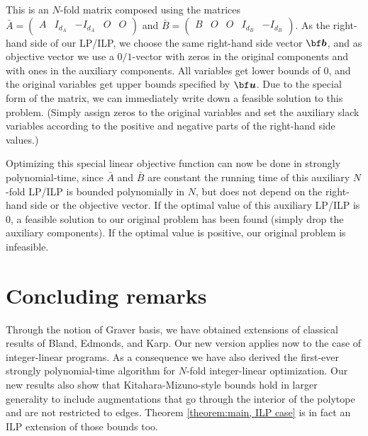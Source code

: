 \documentclass[moor]{informs1hack}              %
\def\ve#1{\mathchoice{\mbox{\boldmath$\displaystyle\bf#1$}}
{\mbox{\boldmath$\textstyle\bf#1$}}
{\mbox{\boldmath$\scriptstyle\bf#1$}}
{\mbox{\boldmath$\scriptscriptstyle\bf#1$}}}
\newcommand\veb{{\ve b}}
\newcommand\veu{{\ve u}}
\newcommand{\maO}{O}            %
\begin{document}
\noindent This is an $N$-fold matrix composed using the matrices $\bar{A}=\begin{pmatrix}A&I_{d_A}&-I_{d_A}&\maO&\maO\end{pmatrix}$ and $\bar{B}=\begin{pmatrix}B&\maO&\maO&I_{d_B}&-I_{d_B}\end{pmatrix}$. As the right-hand side of our LP/ILP, we choose the same right-hand side vector $\veb$, and as objective vector we use a $0/1$-vector with zeros in the original components and with ones in the auxiliary components. All variables get lower bounds of $0$, and the original variables get upper bounds specified by $\veu$. Due to the special form of the matrix, we can immediately write down a feasible solution to this problem. (Simply assign zeros to the original variables and set the auxiliary slack variables according to the positive and negative parts of the right-hand side values.)

  Optimizing this special linear objective function can now be done in strongly polynomial-time, since  $\bar{A}$ and $\bar{B}$ are constant the running time of this auxiliary $N$-fold LP/ILP is bounded polynomially in $N$, but does not depend on the right-hand side or the objective vector. If the optimal value of this auxiliary LP/ILP is $0$, a feasible solution to our original problem has been found (simply drop the auxiliary components). If the optimal value is positive, our original problem is infeasible.
\Halmos
\endproof

\section{Concluding remarks} 

Through the notion of Graver basis, we have obtained extensions of classical results of Bland, Edmonds, and Karp. Our new
version applies now to the case of integer-linear programs. As a consequence we have also derived  the first-ever strongly polynomial-time 
algorithm for $N$-fold integer-linear optimization.  Our new results also show that  Kitahara-Mizuno-style bounds \cite{kitaharamizuno} hold in larger generality to include augmentations that go through the interior of the polytope and are not restricted to edges. Theorem \ref{theorem:main, ILP case} is in fact an ILP extension of those bounds too.
\end{document}
